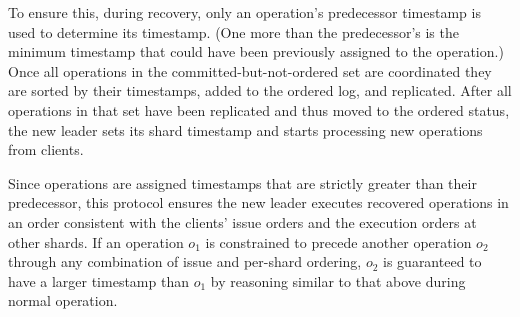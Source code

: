 To ensure this, during recovery, only an operation's predecessor timestamp is used to determine its timestamp.
(One more than the predecessor's is the minimum timestamp that could have been previously assigned to the operation.) 
Once all operations in the committed-but-not-ordered set are coordinated they are sorted by their timestamps, added to the ordered log, and replicated.
After all operations in that set have been replicated and thus moved to the ordered status, the new leader sets its shard timestamp and starts processing new operations from clients.

Since operations are assigned timestamps that are strictly greater than their predecessor, this protocol ensures the new leader executes recovered operations
in an order consistent with the clients' issue orders and the execution orders at other shards. If an operation $o_1$ is constrained to precede another operation $o_2$ through any combination of issue and per-shard ordering, $o_2$
is guaranteed to have a larger timestamp than $o_1$ by reasoning similar to that above during normal operation. 


